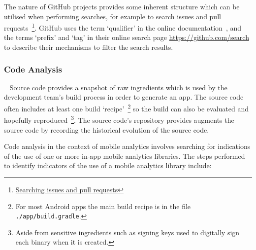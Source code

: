 The nature of GitHub projects provides some inherent structure which can be utilised when performing searches, for example to search issues and pull requests~\footnote{\href{https://docs.github.com/en/search-github/searching-on-github/searching-issues-and-pull-requests}{Searching issues and pull requests}}. GitHub uses the term `qualifier' in the online documentation~\citep{github2021_searching_code_github_docs}, and the terms `prefix' and `tag' in their online search page \url{https://github.com/search} to describe their mechanisms to filter the search results. 



\subsubsection{Code Analysis}~\label{section-code-analysis-research-method}   
Source code provides a snapshot of raw ingredients which is used by the development team's build process in order to generate an app. The source code often includes at least one build `recipe'~\footnote{For most Android apps the main build recipe is in the file \texttt{./app/build.gradle}.} so the build can also be evaluated and hopefully reproduced~\footnote{Aside from sensitive ingredients such as signing keys used to digitally sign each binary when it is created.}. The source code's repository provides augments the source code by recording the historical evolution of the source code.

Code analysis in the context of mobile analytics involves searching for indications of the use of one or more in-app mobile analytics libraries. The steps performed to identify indicators %
of the use of a mobile analytics library include:

